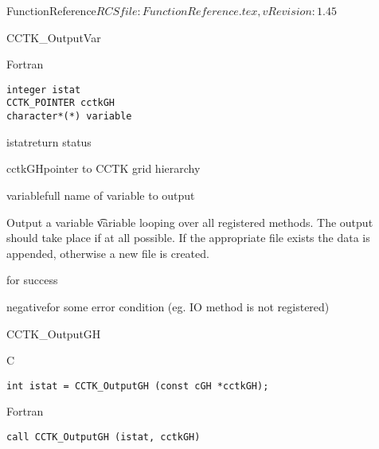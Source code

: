 \begin{cactuspart}{5}{FunctionReference}{$RCSfile: FunctionReference.tex,v $}{$Revision: 1.45 $}
\begin{FunctionDescription}{CCTK\_OutputVar}
\begin{Synopsis}{Fortran}
\begin{verbatim}
integer istat
CCTK_POINTER cctkGH
character*(*) variable
\end{verbatim}
\end{Synopsis}
\begin{Parameter}{istat}return status\end{Parameter}
\begin{Parameter}{cctkGH}pointer to CCTK grid hierarchy\end{Parameter}
\begin{Parameter}{variable}full name of variable to output\end{Parameter}
\begin{Discussion}
Output a variable {\t variable} looping over all registered methods.
The output should take place if at all possible.
If the appropriate file exists the data is appended, otherwise a new
file is created.
\end{Discussion}
\begin{Error}{0}for success\end{Error}
\begin{Error}{negative}for some error condition (eg. IO method is not registered)\end{Error}
\end{FunctionDescription}


\begin{FunctionDescription}{CCTK\_OutputGH}
\label{CCTK-OutputGH}
\begin{Synopsis}{C}
\begin{verbatim}
int istat = CCTK_OutputGH (const cGH *cctkGH);
\end{verbatim}
\end{Synopsis}
\begin{Synopsis}{Fortran}
\begin{verbatim}
call CCTK_OutputGH (istat, cctkGH)


\end{verbatim}
\end{Synopsis}
\end{FunctionDescription}
\end{cactuspart}
